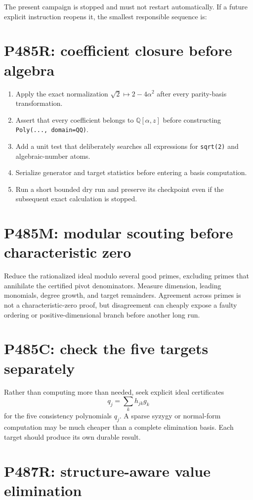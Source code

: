\documentclass[11pt,a4paper,openany]{report}
\newcommand{\Q}{\mathbb Q}
\begin{document}
The present campaign is stopped and must not restart automatically. If a
future explicit instruction reopens it, the smallest responsible sequence is:

\section{P485R: coefficient closure before algebra}
\begin{enumerate}
\item Apply the exact normalization
\(\sqrt2\mapsto2-4\alpha^2\) after every parity-basis transformation.
\item Assert that every coefficient belongs to
\(\Q[\alpha,z]\) before constructing \texttt{Poly(..., domain=QQ)}.
\item Add a unit test that deliberately searches all expressions for
\texttt{sqrt(2)} and algebraic-number atoms.
\item Serialize generator and target statistics before entering a basis
computation.
\item Run a short bounded dry run and preserve its checkpoint even if the
subsequent exact calculation is stopped.
\end{enumerate}

\section{P485M: modular scouting before characteristic zero}

Reduce the rationalized ideal modulo several good primes, excluding primes
that annihilate the certified pivot denominators. Measure dimension, leading
monomials, degree growth, and target remainders. Agreement across primes is
not a characteristic-zero proof, but disagreement can cheaply expose a
faulty ordering or positive-dimensional branch before another long run.

\section{P485C: check the five targets separately}

Rather than computing more than needed, seek explicit ideal certificates
\[
 q_j=\sum_k h_{jk}g_k
\]
for the five consistency polynomials \(q_j\). A sparse syzygy or
normal-form computation may be much cheaper than a complete elimination
basis. Each target should produce its own durable result.

\section{P487R: structure-aware value elimination}
\end{document}
